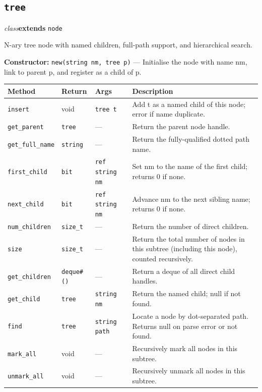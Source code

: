 \documentclass[11pt,letterpaper]{report}
\begin{document}
\subsection*{\texttt{tree}}
\noindent\small\textit{class}\quad \textbf{extends} \texttt{node}\par

N-ary tree node with named children, full-path support, and hierarchical search.

\noindent\textbf{Constructor:} \texttt{new(string nm, tree p)} --- Initialise the node with name nm, link to parent p, and register as a child of p.

\begin{xltabular}{\linewidth}{>{\small}p{1.35in} >{\small}p{1.25in} >{\small}p{0.95in} >{\small}X}
\toprule
\textbf{Method} & \textbf{Return} & \textbf{Args} & \textbf{Description} \\
\midrule
\endhead
\bottomrule
\endfoot
\texttt{insert} & void & \texttt{tree t} & Add t as a named child of this node; error if name duplicate. \\
\texttt{get\_parent} & \texttt{tree} & --- & Return the parent node handle. \\
\texttt{get\_full\_name} & \texttt{string} & --- & Return the fully-qualified dotted path name. \\
\texttt{first\_child} & \texttt{bit} & \texttt{ref string nm} & Set nm to the name of the first child; returns 0 if none. \\
\texttt{next\_child} & \texttt{bit} & \texttt{ref string nm} & Advance nm to the next sibling name; returns 0 if none. \\
\texttt{num\_children} & \texttt{size\_t} & --- & Return the number of direct children. \\
\texttt{size} & \texttt{size\_t} & --- & Return the total number of nodes in this subtree (including this node), counted recursively. \\
\texttt{get\_children} & \texttt{deque\#()} & --- & Return a deque of all direct child handles. \\
\texttt{get\_child} & \texttt{tree} & \texttt{string nm} & Return the named child; null if not found. \\
\texttt{find} & \texttt{tree} & \texttt{string path} & Locate a node by dot-separated path. Returns null on parse error or not found. \\
\texttt{mark\_all} & void & --- & Recursively mark all nodes in this subtree. \\
\texttt{unmark\_all} & void & --- & Recursively unmark all nodes in this subtree. \\
\end{xltabular}
\end{document}
